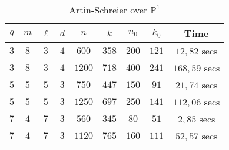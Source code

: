 \documentclass[a4paper]{article}
\begin{document}
\begin{table}[h]
\begin{center}
\begin{tabular}{|c|c|c|c|c|c|c|c|c|}
    \hline
   $q$ & $m$ & $\ell$ & $d$ & $n$ & $k$ & $n_0$ & $k_0$ & \textbf{Time}  \\
   \hline
     $3$& $8$ & $3$ & $4$ & $600$ & $358$ & $200$ & $121$ & $12,82$ secs \\
     \hline
       $3$ & $8$ & $3$ & $4$ & $1200$ & $718$ & $400$ & $241$ & $168,59$ secs\\
     \hline
       $5$& $5$ & $5$ & $3$ & $750$ & $447$ & $150$ & $91$ & $21,74$ secs \\
     \hline
       $5$& $5$&$5$ &$3$ &$1250$ &$697$ &$250$ &$141$ & $112,06$ secs \\
     \hline
       $7$&$4$ &$7$ &$3$ &$560$ &$345$ &$80$ &$51$ & $2,85$ secs\\
     \hline
       $7$&$4$ &$7$ &$3$ &$1120$ &$765$ &$160$ &$111$ &$52,57$ secs \\
     \hline
\end{tabular}
\caption{Artin-Schreier over $\mathbb{P}^1$}
\end{center}
\end{table}
\end{document}
